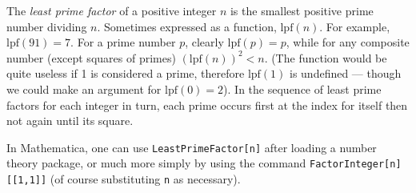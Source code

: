 \documentclass[12pt]{article}
\newcommand{\lpf}{\textrm{lpf}}
\begin{document}
The {\em least prime factor} of a positive integer $n$ is the smallest positive prime number dividing $n$. Sometimes expressed as a function, $\lpf(n)$. For example, $\lpf(91) = 7$. For a prime number $p$, clearly $\lpf(p) = p$, while for any composite number (except squares of primes) $(\lpf(n))^2 < n$. (The function would be quite useless if 1 is considered a prime, therefore $\lpf(1)$ is undefined --- though we could make an argument for $\lpf(0) = 2$). In the sequence of least prime factors for each integer in turn, each prime occurs first at the index for itself then not again until its square.

In Mathematica, one can use \verb=LeastPrimeFactor[n]= after loading a number theory package, or much more simply by using the command \verb=FactorInteger[n][[1,1]]= (of course substituting \verb=n= as necessary).
\end{document}

